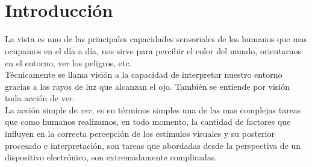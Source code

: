 \documentclass[12pt]{book} %
\begin{document}
\begin{titlepage}



\newpage
$\ $
\thispagestyle{empty}
\end{titlepage}

\lhead[\thepage]{\rightmark}
\rhead[\leftmark]{\thepage}
\setcounter{tocdepth}{4}   %
\tableofcontents %
\cleardoublepage
{} %
\listoffigures

$\ $
\thispagestyle{empty} 
\setcounter{page}{1}			 

\chapter*{Introducción}
\lhead[\thepage]{}
\rhead[]{\thepage}

	La vista es uno de las principales capacidades sensoriales de los humanos que mas ocupamos en el día a día, 
	nos sirve para percibir el color del mundo, orientarnos en el entorno, ver los peligros, etc.\\
	Técnicamente se llama visión a la capacidad de interpretar nuestro entorno gracias a los rayos de luz que alcanzan
	el ojo. También se entiende por visión toda acción de ver.\\	
	La acción simple de \textit{ver}, es en términos simples una de las mas complejas tareas que como humanos realizamos, en
	todo momento, la cantidad de factores que influyen en la correcta percepción de los estímulos visuales y su posterior 
	procesado e interpretación, son tareas que abordadas desde la perspectiva de un dispositivo electrónico, son extremadamente
	complicadas.\\
	
\end{document}
